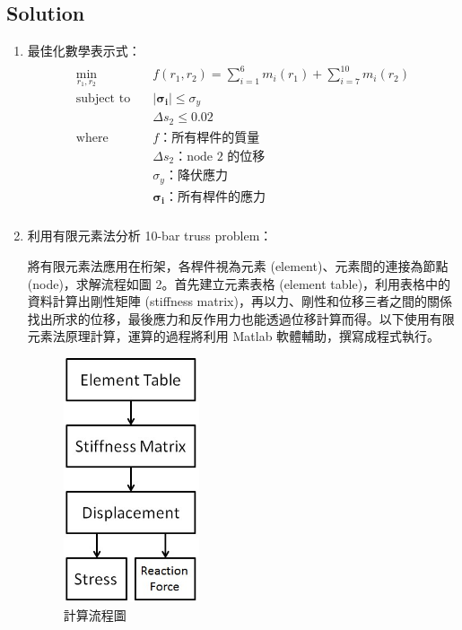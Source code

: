 \documentclass[12pt, a4paper]{article}
\begin{document}
\subsection*{Solution}
\begin{enumerate}
    \item 最佳化數學表示式：
    \begin{align}
        \begin{split}
            \min_{r_1,r_2} \quad & f(r_1,r_2) = \sum_{i=1}^{6} m_i(r_1) + \sum_{i=7}^{10} m_i(r_2) \\
            \mbox{subject to} \quad & \left \lvert \bm{\sigma_i} \right \lvert \le \sigma_y\\
            & \Delta s_2 \le 0.02\\
            \mbox{where} \quad & f \mbox{：所有桿件的質量}\\
            & \Delta s_2 \mbox{：node 2 的位移}\\
            & \sigma_y \mbox{：降伏應力}\\
            & \bm{\sigma_i} \mbox{：所有桿件的應力}\\
        \end{split}
        \label{eq:opt}
    \end{align}
    
    \item 利用有限元素法分析 10-bar truss problem：
    
    將有限元素法應用在桁架，各桿件視為元素 (element)、元素間的連接為節點 (node)，求解流程如圖 2。首先建立元素表格 (element table)，利用表格中的資料計算出剛性矩陣 (stiffness matrix)，再以力、剛性和位移三者之間的關係找出所求的位移，最後應力和反作用力也能透過位移計算而得。以下使用有限元素法原理計算，運算的過程將利用 Matlab 軟體輔助，撰寫成程式執行。
    \begin{figure}[h]
        \centering
        \includegraphics[width=4cm]{./pic/flowchart}
        \caption{計算流程圖}
        \label{f:flowchart}
    \end{figure}
    

\end{enumerate}
\end{document}
